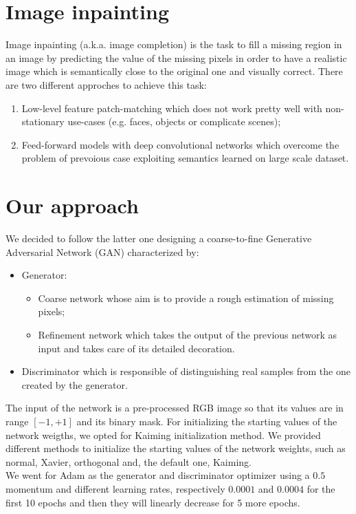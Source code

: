 \documentclass[10pt,twocolumn,letterpaper]{article}
\begin{document}
\section{Image inpainting}
Image inpainting (a.k.a. image completion) is the task to fill a missing region
in an image by predicting the value of the missing pixels in order to have a
realistic image which is semantically close to the original one and visually correct.
There are two different approches to achieve this task:
\begin{enumerate}
	\item
	Low-level feature patch-matching which does not work pretty well with non-stationary use-cases (e.g. faces, objects or complicate scenes);
	\item
	Feed-forward models with deep convolutional networks which overcome the problem of prevoious case exploiting semantics learned on large scale dataset.
\end{enumerate}
\section{Our approach}
We decided to follow the latter one designing a coarse-to-fine Generative Adversarial Network (GAN) characterized by:
\begin{itemize}
	\item
	Generator:
	\begin{itemize}
		\item 
		Coarse network whose aim is to provide a rough estimation of missing pixels;
		\item
		Refinement network which takes the output of the previous network as input and takes care of its detailed decoration.
	\end{itemize}
	\item
	Discriminator which is responsible of distinguishing real samples from the one created by the generator.
\end{itemize}
The input of the network is a pre-processed RGB image so that its values are in range \([-1,+1]\) and its binary mask.
For initializing the starting values of the network weigths, we opted for Kaiming initialization method.
We provided different methods to initialize the starting values of the network weights, such as normal, Xavier, orthogonal and, the default one, Kaiming.
\\
We went for Adam as the generator and discriminator optimizer using a \(0.5\) momentum and different learning rates, respectively \(0.0001\) and \(0.0004\) for the first 10 epochs and then they will linearly decrease for 5 more epochs.
\end{document}
